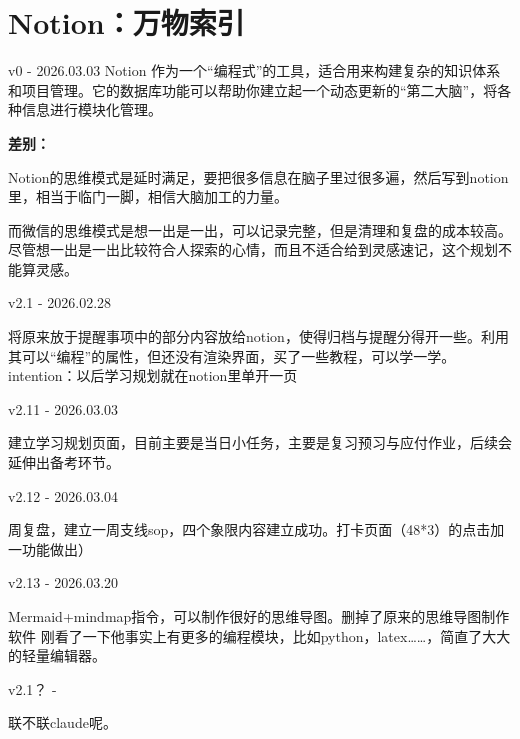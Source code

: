 \documentclass[11pt, a4paper, oneside]{book}
\begin{document}
\section{Notion：万物索引}
\begin{flowing}{v0 - 2026.03.03}
Notion 作为一个“编程式”的工具，适合用来构建复杂的知识体系和项目管理。它的数据库功能可以帮助你建立起一个动态更新的“第二大脑”，将各种信息进行模块化管理。

\large\textbf{差别：}

Notion的思维模式是延时满足，要把很多信息在脑子里过很多遍，然后写到notion里，相当于临门一脚，相信大脑加工的力量。

而微信的思维模式是想一出是一出，可以记录完整，但是清理和复盘的成本较高。尽管想一出是一出比较符合人探索的心情，而且不适合给到灵感速记，这个规划不能算灵感。
\end{flowing}
\begin{updatelog}{v2.1 - 2026.02.28}
    
    将原来放于提醒事项中的部分内容放给notion，使得归档与提醒分得开一些。利用其可以“编程”的属性，但还没有渲染界面，买了一些教程，可以学一学。
    intention：以后学习规划就在notion里单开一页
\end{updatelog}

\begin{updatelog}{v2.11 - 2026.03.03}
    
    建立学习规划页面，目前主要是当日小任务，主要是复习预习与应付作业，后续会延伸出备考环节。
    
\end{updatelog}

\begin{updatelog}{v2.12 - 2026.03.04}
    
   周复盘，建立一周支线sop，四个象限内容建立成功。打卡页面（48*3）的点击加一功能做出）
    
\end{updatelog}

\begin{updatelog}{v2.13 - 2026.03.20}
    
   Mermaid+mindmap指令，可以制作很好的思维导图。删掉了原来的思维导图制作软件
   刚看了一下他事实上有更多的编程模块，比如python，latex……，简直了大大的轻量编辑器。
    
\end{updatelog}

\begin{updatelog}{v2.1？ - }
     
   联不联claude呢。

\end{updatelog}
\end{document}
